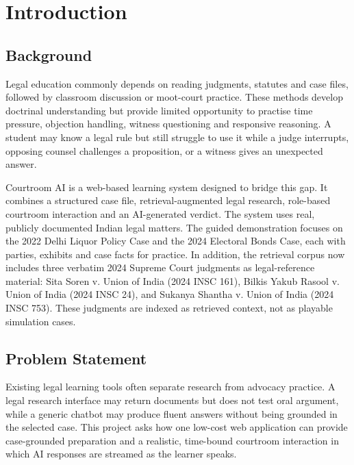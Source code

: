 \documentclass[12pt]{article}
\begin{document}
\section{Introduction}
\subsection{Background}
Legal education commonly depends on reading judgments, statutes and case files, followed by classroom discussion or moot-court practice. These methods develop doctrinal understanding but provide limited opportunity to practise time pressure, objection handling, witness questioning and responsive reasoning. A student may know a legal rule but still struggle to use it while a judge interrupts, opposing counsel challenges a proposition, or a witness gives an unexpected answer.

Courtroom AI is a web-based learning system designed to bridge this gap. It combines a structured case file, retrieval-augmented legal research, role-based courtroom interaction and an AI-generated verdict. The system uses real, publicly documented Indian legal matters. The guided demonstration focuses on the 2022 Delhi Liquor Policy Case and the 2024 Electoral Bonds Case, each with parties, exhibits and case facts for practice. In addition, the retrieval corpus now includes three verbatim 2024 Supreme Court judgments as legal-reference material: Sita Soren v. Union of India (2024 INSC 161), Bilkis Yakub Rasool v. Union of India (2024 INSC 24), and Sukanya Shantha v. Union of India (2024 INSC 753). These judgments are indexed as retrieved context, not as playable simulation cases.

\subsection{Problem Statement}
Existing legal learning tools often separate research from advocacy practice. A legal research interface may return documents but does not test oral argument, while a generic chatbot may produce fluent answers without being grounded in the selected case. This project asks how one low-cost web application can provide case-grounded preparation and a realistic, time-bound courtroom interaction in which AI responses are streamed as the learner speaks.
\end{document}
